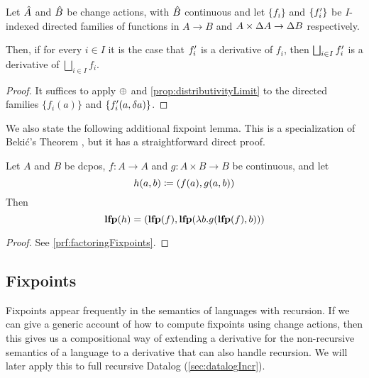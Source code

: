 \begin{corollary}
  \label{cor:diffContinuous}
  Let $\hat{A}$ and $\hat{B}$ be change actions, with $\hat{B}$ continuous and let $\{f_i\}$ and $\{f_i'\}$ be
  $I$-indexed directed families of functions in $A \rightarrow B$ and $A \times \Delta A \rightarrow \Delta B$ respectively.

  Then, if for every $i \in I$ it is the case that $f_i'$ is a derivative of $f_i$, then $\bigsqcup_{i \in I} f_i'$ is
  a derivative of $\bigsqcup_{i \in I} f_i $.
\end{corollary}
\ifproofs
\begin{proof}
  It suffices to apply $\oplus$ and \cref{prop:distributivityLimit} to the directed families $\{ f_i(a) \}$ and
  $\{ f_i'(a, \delta a) \}$.
\end{proof}
\fi

We also state the following additional fixpoint lemma. This is a specialization of
Beki\'c's Theorem \autocite[][section 10.1]{winskel1993formal}, but it has a straightforward direct proof.

\begin{prop}[name=Factoring of fixpoints, restate=factoringFixpoints]
  \label{prop:factoringFixpoints}
  Let $A$ and $B$ be dcpos, $f : A \rightarrow A$ and $g: A \times B \rightarrow B$ be continuous, and let
  \begin{displaymath}
    h(a, b) \coloneqq (f(a), g(a, b))
  \end{displaymath}
  Then
  \begin{displaymath}
    \mathbf{lfp}(h) = (\mathbf{lfp}(f), \mathbf{lfp}(\lambda b . g(\mathbf{lfp}(f), b)))
  \end{displaymath}
\end{prop}
\ifproofs
\begin{proof}
  See \cref{prf:factoringFixpoints}.
\end{proof}
\fi

\subsection{Fixpoints}
\label{sec:fixpoints}

Fixpoints appear frequently in the semantics of languages with recursion. If we
can give a generic account of how to compute fixpoints using change actions,
then this gives us a compositional way of extending a derivative for the
non-recursive semantics of a language to a derivative that can also handle recursion.
We will later apply this to full recursive Datalog (\cref{sec:datalogIncr}).

